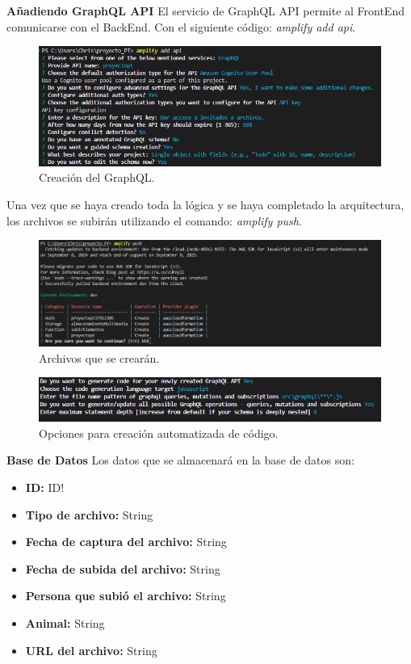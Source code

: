  \noindent \textbf{\large Añadiendo GraphQL API} \newline
El servicio de GraphQL API permite al FrontEnd comunicarse con el BackEnd. Con el siguiente código: \textit{amplify add api}.
\begin{figure}[H]
    \centering
    \includegraphics[width=\textwidth]{imagenes/add_API}
    \caption{Creación del GraphQL.}
\end{figure}
Una vez que se haya creado toda la lógica y se haya completado la arquitectura, los archivos se subirán utilizando el comando: \textit{amplify push}.
\begin{figure}[H]
    \centering
    \includegraphics[width=\textwidth]{imagenes/created_files}
    \caption{Archivos que se crearán.}
\end{figure}
\begin{figure}[H]
    \centering
    \includegraphics[width=\textwidth]{imagenes/opt}
    \caption{Opciones para creación automatizada de código.}
\end{figure}

 \noindent \textbf{\large Base de Datos} \newline
Los datos que se almacenará en la base de datos son:
\begin{itemize}
    \item \textbf{ID:} ID!
    \item \textbf{Tipo de archivo:} String
    \item \textbf{Fecha de captura del archivo:} String
    \item \textbf{Fecha de subida del archivo:} String
    \item \textbf{Persona que subió el archivo:} String
    \item \textbf{Animal:} String
    \item \textbf{URL del archivo:} String
\end{itemize}

